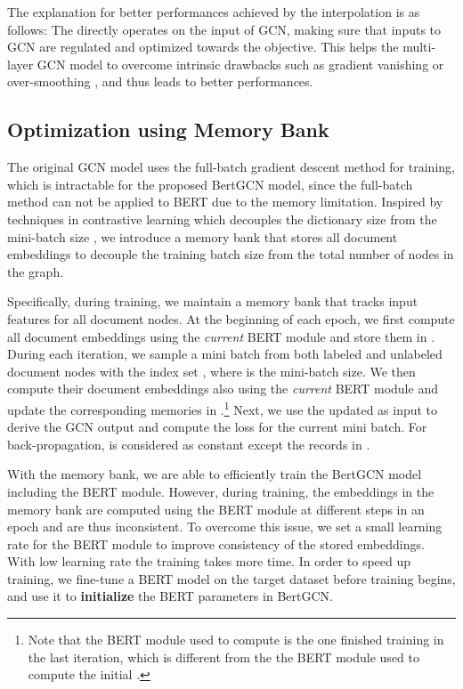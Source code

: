 \documentclass[11pt,a4paper]{article}
\begin{document}
The explanation for better performances achieved by the interpolation is as follows: 
The  directly operates on the input of GCN, making sure that inputs to GCN are regulated and optimized towards the  objective.
This helps the multi-layer GCN model to overcome intrinsic drawbacks such as gradient vanishing or over-smoothing \citep{li2018deeper}, and thus leads to better performances. 




 \subsection{Optimization using Memory Bank}
 


The original GCN model uses the full-batch gradient descent method for training, which is intractable for the proposed BertGCN model, since the full-batch method can not be applied to BERT due to the memory limitation.
Inspired by techniques in contrastive learning which decouples the dictionary size from the mini-batch size \citep{wu2018unsupervised,he2020momentum}, we introduce a memory bank that stores all document embeddings to decouple the training batch size from the total number of nodes in the graph.
 
Specifically, during training, we maintain a memory bank  that tracks input features for all document nodes. At the beginning of each epoch, we first compute all document embeddings using the {\it current} BERT module and store them in . During each iteration, we sample a mini batch from both labeled and unlabeled document nodes with the index set , where  is the mini-batch size. We then compute their document embeddings  also using the {\it current} BERT module and update the corresponding memories in .\footnote{Note that the BERT module used to compute  is the one finished training in the last iteration, which is different from the the BERT module used to compute the initial .}
Next, we use the updated  as input to derive the GCN output and compute the loss for the current mini batch. For back-propagation,  is considered as constant except the records in .

With the memory bank, we are able to efficiently train the BertGCN model including the BERT module.
However, during training, the embeddings in the memory bank are computed using the BERT module at different steps in an epoch and are thus inconsistent. To overcome this issue, we set a small learning rate for the BERT module to improve consistency of the stored embeddings. With low learning rate the training takes more time. In order to speed up training, we fine-tune a BERT model on the target dataset before training begins, and use it to {\bf initialize} the BERT parameters  in  BertGCN.
\end{document}
